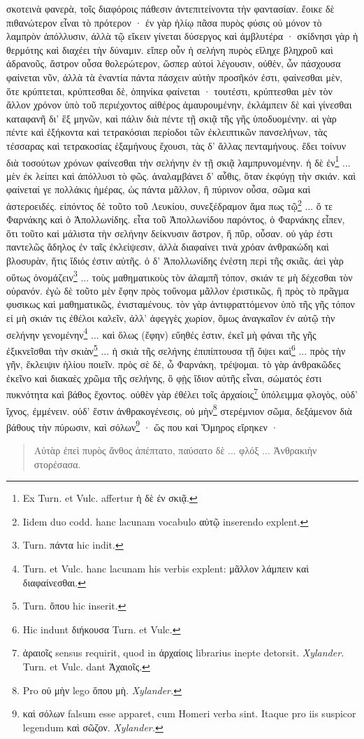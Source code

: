 \documentclass[a4paper, 11pt, oneside, polutonikogreek, german]{article}
\begin{document}
σκοτεινὰ φανερὰ, τοῖς διαφόροις πάθεσιν ἀντεπιτείνοντα τὴν φαντασίαν. ἔοικε δὲ πιθανώτερον εἶναι τὸ πρότερον · ἐν γὰρ ἡλίῳ πᾶσα πυρὸς φύσις οὐ μόνον τὸ λαμπρὸν ἀπόλλυσιν, ἀλλὰ τῷ εἴκειν γίνεται δύσεργος καὶ ἀμβλυτέρα · σκίδνησι γὰρ ἡ θερμότης καὶ διαχέει τὴν δύναμιν. εἴπερ οὖν ἡ σελήνη πυρὸς εἴληχε βληχροῦ καὶ ἀδρανοῦς, ἄστρον οὖσα θολερώτερον, ὥσπερ αὐτοὶ λέγουσιν, οὐθὲν, ὧν πάσχουσα φαίνεται νῦν, ἀλλὰ τὰ ἐναντία πάντα πάσχειν αὐτὴν προσῆκόν ἐστι, φαίνεσθαι μὲν, ὅτε κρύπτεται, κρύπτεσθαι δὲ, ὁπηνίκα φαίνεται · τουτέστι, κρύπτεσθαι μὲν τὸν ἄλλον χρόνον ὑπὸ τοῦ περιέχοντος αἰθέρος ἀμαυρουμένην, ἐκλάμπειν δὲ καὶ γίνεσθαι καταφανῆ δι' ἓξ μηνῶν, καὶ πάλιν διὰ πέντε τῇ σκιᾷ τῆς γῆς ὑποδυομένην. αἱ γὰρ πέντε καὶ ἑξήκοντα καὶ τετρακόσιαι περίοδοι τῶν ἐκλειπτικῶν πανσελήνων, τὰς τέσσαρας καὶ τετρακοσίας ἑξαμήνους ἔχουσι, τὰς δ' ἄλλας πενταμήνους. ἔδει τοίνυν διὰ τοσούτων χρόνων φαίνεσθαι τὴν σελήνην ἐν τῇ σκιᾷ λαμπρυνομένην. ἡ δὲ ἐν\footnote{Ex Turn. et Vulc. affertur ἡ δὲ ἐν σκιᾷ.} ... μὲν ἐκ λείπει καὶ ἀπόλλυσι τὸ φῶς. ἀναλαμβάνει δ' αὖθις, ὅταν ἐκφύγῃ τὴν σκιάν. καὶ φαίνεταί γε πολλάκις ἡμέρας, ὡς πάντα μᾶλλον, ἢ πύρινον οὖσα, σῶμα καὶ ἀστεροειδές. εἰπόντος δὲ τοῦτο τοῦ Λευκίου, συνεξέδραμον ἅμα πως τῷ\footnote{Iidem duo codd. hanc lacunam vocabulo αὐτῷ inserendo explent.} ... ὅ τε Φαρνάκης καὶ ὁ Ἀπολλωνίδης. εἶτα τοῦ Ἀπολλωνίδου παρόντος, ὁ Φαρνάκης εἶπεν, ὅτι τοῦτο καὶ μάλιστα τὴν σελήνην δείκνυσιν ἄστρον, ἢ πῦρ, οὖσαν. οὐ γάρ ἐστι παντελῶς ἄδηλος ἐν ταῖς ἐκλείψεσιν, ἀλλὰ διαφαίνει τινὰ χρόαν ἀνθρακώδη καὶ βλοσυρὰν, ἥτις ἴδιός ἐστιν αὐτῆς. ὁ δ' Ἀπολλωνίδης ἐνέστη περὶ τῆς σκιᾶς. ἀεὶ γὰρ οὕτως ὀνομάζειν\footnote{Turn. πάντα hic indit.} ... τοὺς μαθηματικοὺς τὸν ἀλαμπῆ τόπον, σκιάν τε μὴ δέχεσθαι τὸν οὐρανόν. ἐγὼ δὲ τοῦτο μὲν ἔφην πρὸς τοὔνομα μᾶλλον ἐριστικῶς, ἢ πρὸς τὸ πρᾶγμα φυσικως καὶ μαθηματικῶς, ἐνισταμένους. τὸν γὰρ ἀντιφραττόμενον ὑπὸ τῆς γῆς τόπον εἰ μὴ σκιάν τις ἐθέλοι καλεῖν, ἀλλ' ἀφεγγὲς χωρίον, ὅμως ἀναγκαῖον ἐν αὐτῷ τὴν σελήνην γενομένην\footnote{Turn. et Vulc. hanc lacunam his verbis explent: μᾶλλον λάμπειν καὶ διαφαίνεσθαι.} ... καὶ ὅλως (ἔφην) εὔηθές ἐστιν, ἐκεῖ μὴ φάναι τῆς γῆς ἐξικνεῖσθαι τὴν σκιὰν\footnote{Turn. ὅπου hic inserit.} ... ἡ σκιὰ τῆς σελήνης ἐπιπίπτουσα τῇ ὄψει καὶ\footnote{Hic indunt διήκουσα Turn. et Vulc.} ... πρὸς τὴν γῆν, ἔκλειψιν ἡλίου ποιεῖν. πρὸς σὲ δὲ, ὦ Φαρνάκη, τρέψομαι. τὸ γὰρ ἀνθρακῶδες ἐκεῖνο καὶ διακαὲς χρῶμα τῆς σελήνης, ὃ φῂς ἴδιον αὐτῆς εἶναι, σώματός ἐστι πυκνότητα καὶ βάθος ἔχοντος. οὐθὲν γὰρ ἐθέλει τοῖς ἀρχαίοις\footnote{ἀραιοῖς sensus requirit, quod in ἀρχαίοις librarius inepte detorsit. \emph{Xylander.} Turn. et Vulc. dant Ἀχαιοῖς.} ὑπόλειμμα φλογὸς, οὐδ' ἴχνος, ἐμμένειν. οὐδ' ἔστιν ἀνθρακογένεσις, οὐ μὴν\footnote{Pro οὐ μὴν lego ὅπου μὴ. \emph{Xylander.}} στερέμνιον σῶμα, δεξάμενον διὰ βάθους τὴν πύρωσιν, καὶ σόλων\footnote{καὶ σόλων falsum esse apparet, cum Homeri verba sint. Itaque pro iis suspicor legendum καὶ σῶζον. \emph{Xylander.}} · ὥς που καὶ Ὅμηρος εἴρηκεν ·
\begin{quotation}
Αὐτὰρ ἐπεὶ πυρὸς ἄνθος ἀπέπτατο, παύσατο δὲ ... φλόξ ... Ἀνθρακιὴν στορέσασα.
\end{quotation}
\end{document}
